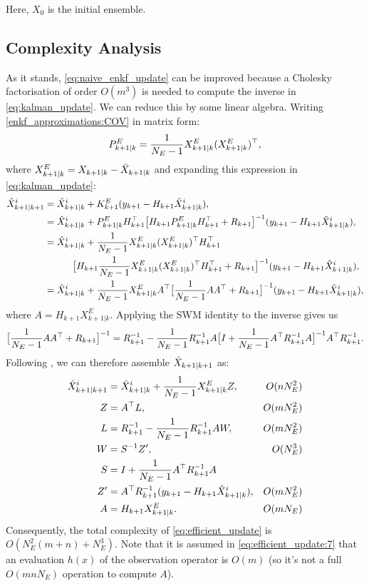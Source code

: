 \begin{remark}
Here, $X_0$ is the initial ensemble.
\end{remark}

\subsection{Complexity Analysis}
As it stands, \eqref{eq:naive_enkf_update} can be improved because a Cholesky factorisation of order
$O(m^3)$ is needed to compute the inverse in \eqref{eq:kalman_update}. We can reduce this by some linear
algebra. Writing \eqref{enkf_approximations:COV} in matrix form:
\[
P^E_{k+1|k} = \frac{1}{N_E-1} X^E_{k+1|k} (X^E_{k+1|k})^\top,
\]
where $X^E_{k+1|k} = X_{k+1|k} - \bar{X}_{k+1|k}$ and expanding this expression in \eqref{eq:kalman_update}:
\begin{align*}
\hat{X}_{k+1|k+1}^i & = \hat{X}_{k+1|k}^i + K_{k+1}^E (y_{k+1} - H_{k+1} \hat{X}_{k+1|k}^i),\\
& = \hat{X}_{k+1|k}^i + P^E_{k+1|k} H_{k+1}^\top\big[H_{k+1}P^E_{k+1|k} H_{k+1}^\top + R_{k+1}\big]^{-1} (y_{k+1} - H_{k+1} \hat{X}_{k+1|k}^i),\\
& = \hat{X}_{k+1|k}^i + \frac{1}{N_E-1}X^E_{k+1|k} (X^E_{k+1|k})^\top H_{k+1}^\top\\
& \qquad\quad \big[H_{k+1}\frac{1}{N_E-1}X^E_{k+1|k} (X^E_{k+1|k})^\top H_{k+1}^\top + R_{k+1}\big]^{-1} (y_{k+1} - H_{k+1} \hat{X}_{k+1|k}^i),\\
& = \hat{X}_{k+1|k}^i + \frac{1}{N_E-1}X^E_{k+1|k} A^\top \big[\frac{1}{N_E-1}A A^\top + R_{k+1}\big]^{-1} (y_{k+1} - H_{k+1} \hat{X}_{k+1|k}^i),
\end{align*}
where $A = H_{k+1}X^E_{k+1|k}$. Applying the SWM identity to the inverse gives us
\[
\big[\frac{1}{N_E-1}A A^\top + R_{k+1}\big]^{-1} =
R_{k+1}^{-1} - \frac{1}{N_E-1} R_{k+1}^{-1}  A\big[I + \frac{1}{N_E-1}A^\top R_{k+1}^{-1}  A\big]^{-1} A^\top R_{k+1}^{-1}.
\]
Following \cite{mandel2006efficient}, we can therefore assemble $\hat{X}_{k+1|k+1}$ as:
\begin{subequations}\label{eq:efficient_update}
\begin{align}
\hat{X}_{k+1|k+1}^i & = \hat{X}_{k+1|k}^i + \frac{1}{N_E-1}X^E_{k+1|k} Z, & O(nN_E^2)\label{eq:efficient_update:1}\\
Z & = A^\top L, & O(m N_E^2)\label{eq:efficient_update:2}\\
L & = R_{k+1}^{-1} - \frac{1}{N_E-1} R_{k+1}^{-1} A W, & O(m N_E^2)\label{eq:efficient_update:3}\\
W & = S^{-1} Z', & O(N_E^3) \label{eq:efficient_update:4}\\
S & = I + \frac{1}{N_E-1}A^\top R_{k+1}^{-1} A & \label{eq:efficient_update:5}\\
Z' & = A^\top R_{k+1}^{-1} (y_{k+1} - H_{k+1} \hat{X}_{k+1|k}^i), & O(m N_E^2)\label{eq:efficient_update:6}\\
A & = H_{k+1} X^E_{k+1|k}. & O(m N_E)\label{eq:efficient_update:7}
\end{align}
\end{subequations}
Consequently, the total complexity of \eqref{eq:efficient_update} is $O(N_E^2 (m + n)
+ N_E^3)$. Note that it is assumed in \eqref{eq:efficient_update:7} that an evaluation
$h(x)$ of the observation operator is $O(m)$ (so it's not a full $O(mn N_E)$ operation
to compute $A$).

